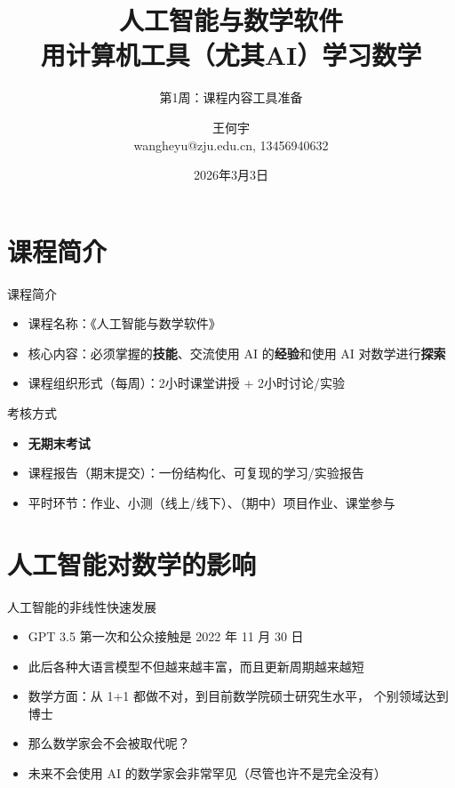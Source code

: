 \documentclass[10pt,aspectratio=169]{beamer}
\title[人工智能与数学软件]{\Large 人工智能与数学软件\\\small 用计算机工具（尤其AI）学习数学}
\subtitle{第1周：课程内容工具准备}
\author{王何宇 \\ wangheyu@zju.edu.cn, 13456940632}
\institute{浙江大学数学科学学院}
\date{2026年3月3日}
\begin{document}
\begin{frame}[plain]
  \titlepage
\end{frame}

\section{课程简介}
\begin{frame}{课程简介}
\begin{itemize}
  \item 课程名称：《人工智能与数学软件》
  \item 核心内容：必须掌握的\textbf{技能}、交流使用 AI 的\textbf{经验}和使用 AI 对数学进行\textbf{探索}
  \item 课程组织形式（每周）：2小时课堂讲授 + 2小时讨论/实验
\end{itemize}
\begin{block}{考核方式}
\begin{itemize}
  \item \textbf{无期末考试}
  \item 课程报告（期末提交）：一份结构化、可复现的学习/实验报告
  \item 平时环节：作业、小测（线上/线下）、（期中）项目作业、课堂参与
\end{itemize}
\end{block}
\end{frame}

\section{人工智能对数学的影响}

\begin{frame}{人工智能的非线性快速发展}
\begin{itemize}
    \item GPT 3.5 第一次和公众接触是 2022 年 11 月 30 日
    \item 此后各种大语言模型不但越来越丰富，而且更新周期越来越短
    \item 数学方面：从 1+1 都做不对，到目前数学院硕士研究生水平，\newline
    个别领域达到博士
    \item 那么数学家会不会被取代呢？
    \item<2-> 未来不会使用 AI 的数学家会非常罕见（尽管也许不是完全没有）
\end{itemize}
\end{frame}
\end{document}

